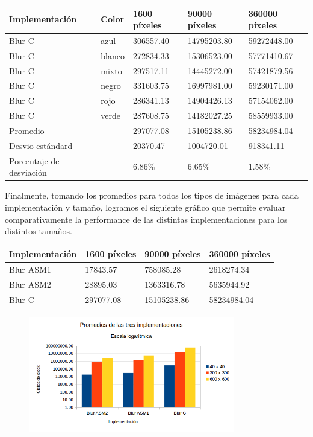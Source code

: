\begin{tabular}{| l | l | l | l | l |}
\hline
Implementación & Color & 1600 píxeles & 90000 píxeles & 360000 píxeles\\
\hline
Blur C & azul & 306557.40 & 14795203.80 & 59272448.00\\ 
\hline
Blur C & blanco & 272834.33 & 15306523.00 & 57771410.67\\ 
\hline
Blur C & mixto &  297517.11 & 14445272.00 & 57421879.56\\ 
\hline
Blur C & negro & 331603.75 & 16997981.00 & 59230171.00\\
\hline
Blur C & rojo & 286341.13 & 14904426.13 & 57154062.00\\
\hline
Blur C & verde & 287608.75 & 14182027.25 & 58559933.00\\ 
\hline
Promedio & &  297077.08 & 15105238.86 & 58234984.04\\
\hline
Desvio estándard  && 20370.47  & 1004720.01 & 918341.11\\
\hline
Porcentaje de desviación  && 6.86\% & 6.65\% & 1.58\%\\
\hline
\end{tabular}

Finalmente, tomando los promedios para todos los tipos de imágenes para cada implementación y tamaño, logramos el siguiente gráfico que permite evaluar comparativamente la performance de las distintas implementaciones para los distintos tamaños.

\begin{tabular}{| l | l | l | l|}
\hline
Implementación  & 1600 píxeles & 90000 píxeles & 360000 píxeles\\
\hline
Blur ASM1  & 17843.57 & 758085.28 & 2618274.34\\
\hline
Blur ASM2  & 28895.03 & 1363316.78 & 5635944.92\\
\hline
Blur C & 297077.08 & 15105238.86 & 58234984.04\\
\hline
\end{tabular}

\begin{figure}[ht]
\centering
\includegraphics[width=90mm]{blur/graficoBlur.png}
\end{figure}

